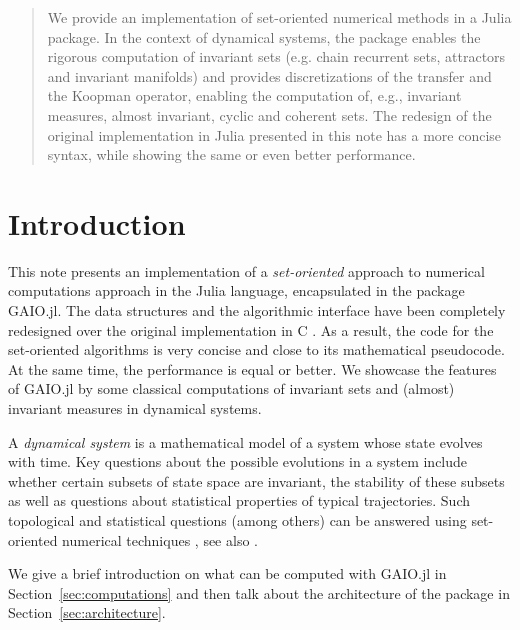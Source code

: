 \documentclass{juliacon}
\begin{document}


\maketitle

\vfill

\begin{abstract}

We provide an implementation of set-oriented numerical methods \cite{DeJu:02,DeFrJu:01} in a Julia package. In the context of dynamical systems, the package enables the rigorous computation of invariant sets (e.g. chain recurrent sets, attractors and invariant manifolds) and provides discretizations of the transfer and the Koopman operator, enabling the computation of, e.g., invariant measures, almost invariant, cyclic and coherent sets. The redesign of the original implementation \cite{GAIO} in Julia presented in this note has a more concise syntax, while showing the same or even better performance.

\end{abstract}

\section{Introduction}

This note presents an implementation of a \emph{set-oriented} approach  to numerical computations approach \cite{DeJu:02,DeFrJu:01} in the Julia language, encapsulated in the package GAIO.jl. The data structures and the algorithmic interface have been completely redesigned over the original implementation in C \cite{GAIO}. As a result, the code for the set-oriented algorithms is very concise and close to its mathematical pseudocode. At the same time, the performance is equal or better. We showcase the features of GAIO.jl by some classical computations of invariant sets and (almost) invariant measures in dynamical systems.  

A \emph{dynamical system} is a mathematical model of a system whose state evolves with time.  Key questions about the possible evolutions in a system  include whether certain subsets of state space are invariant, the stability of these subsets as well as questions about statistical properties of typical trajectories. Such topological and statistical questions (among others) can be answered using set-oriented numerical techniques \cite{DeJu:02,DeFrJu:01}, see also \cite{Hsu:13,Mi:02}. 

We give a brief introduction on what can be computed with GAIO.jl in Section~\ref{sec:computations} and then talk about the architecture of the package in Section~\ref{sec:architecture}.
\end{document}
